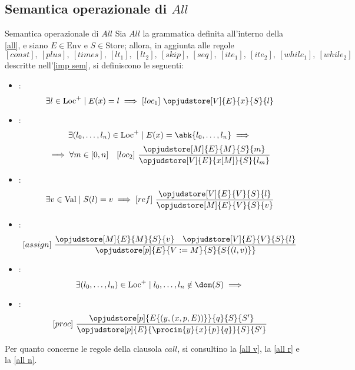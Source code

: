 \documentclass[a4paper, 12pt]{report}
\begin{document}
    \subsection{Semantica operazionale di $All$}

    \begin{framedprop}[label={all sem}, breakable]{Semantica operazionale di $All$}
        Sia $All$ la grammatica definita all'interno della \cref{all}, e siano $E \in \mathrm{Env}$ e $S \in \mathrm{Store}$; allora, in aggiunta alle regole $$[const], \ [plus], \ [times], \ [lt_1], \ [lt_2], \ [skip], \ [seq], \ [ite_1], \ [ite_2], \ [while_1], \ [while_2]$$ descritte nell'\cref{imp sem}, si definiscono le seguenti:

        \begin{itemize}
            \item {}: $$\exists l \in \mathrm{Loc}^+ \mid E(x) = l \implies [loc_1] \ \opjudstore[V]{E}{x}{S}{l}$$
            \item {}: $$\exists (l_0, \ldots, l_n) \in \mathrm{Loc}^+ \mid E(x) = \abk{l_0, \ldots, l_n} \implies$$ $$\implies \forall m \in [0, n] \quad [loc_2] \ \dfrac{\opjudstore[M]{E}{M}{S}{m}}{\opjudstore[V]{E}{x[M]}{S}{l_m}}$$
            \item {}: $$\exists v \in \mathrm{Val} \mid S(l) = v \implies [ref] \ \dfrac{\opjudstore[V]{E}{V}{S}{l}}{\opjudstore[M]{E}{V}{S}{v}}$$
            \item {}: $$[assign] \ \dfrac{\opjudstore[M]{E}{M}{S}{v} \quad \opjudstore[V]{E}{V}{S}{l}}{\opjudstore[p]{E}{V := M}{S}{S\{(l,v)\}}}$$
            \item {}: $$\exists (l_0, \ldots, l_n) \in \mathrm{Loc}^+ \mid l_0, \ldots, l_n \notin \dom(S) \implies$$ 
            \item {}: $$[proc] \ \dfrac{\opjudstore[p]{E\{(y,(x,p, E))\}}{q}{S}{S'}}{\opjudstore[p]{E}{\procin{y}{x}{p}{q}}{S}{S'}}$$
        \end{itemize}

        Per quanto concerne le regole della clausola $call$, si consultino la \cref{all v}, la \cref{all r} e la \cref{all n}.
    \end{framedprop}
\end{document}
